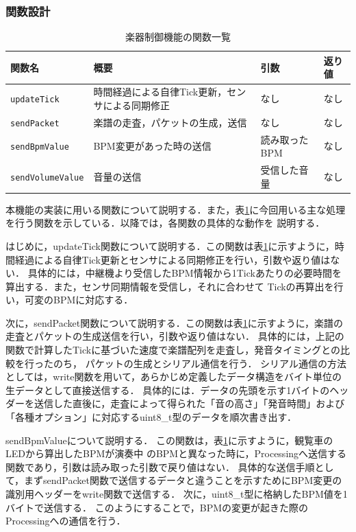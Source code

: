 \documentclass[lualatex,book,paper=a4paper,jafontsize=11.5pt,jafontscale=1.05]{jlreq}
\begin{document}
\subsubsection{関数設計}
\begin{table}[bt]
    \vspace{-1em}
    \caption{楽器制御機能の関数一覧}
    \centering
    \label{tab:func2}
    \begin{tabularx}{\textwidth}{|l|X|X|l|}
    \hline
    \textbf{関数名} & \textbf{概要} & \textbf{引数} & \textbf{返り値}\\
    \hline
    \texttt{updateTick} & 時間経過による自律Tick更新，センサによる同期修正 & なし & なし\\
    \hline
    \texttt{sendPacket} & 楽譜の走査，パケットの生成，送信 & なし & なし\\
    \hline
    \texttt{sendBpmValue} & BPM変更があった時の送信 & 読み取ったBPM & なし \\
    \hline
    \texttt{sendVolumeValue} & 音量の送信 & 受信した音量 & なし \\
    \hline
    \end{tabularx}
\end{table}

本機能の実装に用いる関数について説明する．また，表\ref{tab:func2}に今回用いる主な処理を行う関数を示している．以降では，各関数の具体的な動作を
説明する．\par
はじめに，updateTick関数について説明する．この関数は表\ref{tab:func2}に示すように，時間経過による自律Tick更新とセンサによる同期修正を行い，引数や返り値はない．
具体的には，中継機より受信したBPM情報から1Tickあたりの必要時間を算出する．また，センサ同期情報を受信し，それに合わせて
Tickの再算出を行い，可変のBPMに対応する．\par

次に，sendPacket関数について説明する．この関数は表\ref{tab:func2}に示すように，楽譜の走査とパケットの生成送信を行い，引数や返り値はない．
具体的には，上記の関数で計算したTickに基づいた速度で楽譜配列を走査し，発音タイミングとの比較を行ったのち，
パケットの生成とシリアル通信を行う．
シリアル通信の方法としては，write関数を用いて，あらかじめ定義したデータ構造をバイト単位の生データとして直接送信する．
具体的には．データの先頭を示す1バイトのヘッダーを送信した直後に，走査によって得られた「音の高さ」「発音時間」および「各種オプション」に対応するuint8\_t型のデータを順次書き出す．

sendBpmValueについて説明する．
この関数は，表\ref{tab:func2}に示すように，観覧車のLEDから算出したBPMが演奏中
のBPMと異なった時に，Processingへ送信する関数であり，引数は読み取った引数で戻り値はない．
具体的な送信手順として，まずsendPacket関数で送信するデータと違うことを示すためにBPM変更の識別用ヘッダーをwrite関数で送信する．
次に，uint8\_t型に格納したBPM値を1バイトで送信する．
このようにすることで，BPMの変更が起きた際のProcessingへの通信を行う．
\end{document}
